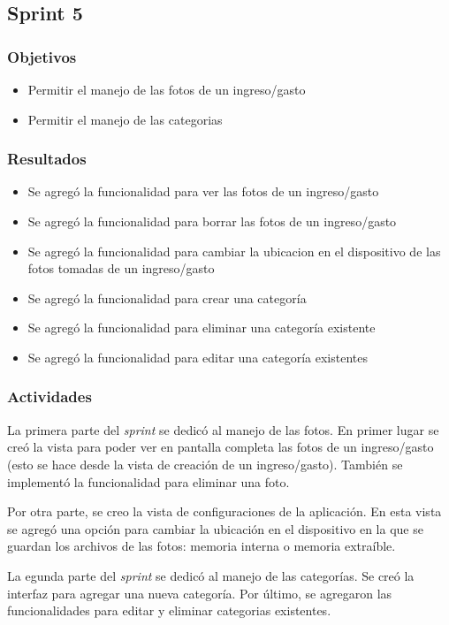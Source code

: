 \subsection{Sprint 5}
\subsubsection{Objetivos}
\begin{itemize}
\item Permitir el manejo de las fotos de un ingreso/gasto
\item Permitir el manejo de las categorias
\end{itemize}

\subsubsection{Resultados}
\begin{itemize}
\item Se agregó la funcionalidad para ver las fotos de un ingreso/gasto
\item Se agregó la funcionalidad para borrar las fotos de un ingreso/gasto
\item Se agregó la funcionalidad para cambiar la ubicacion en el dispositivo de las fotos tomadas de un ingreso/gasto
\item Se agregó la funcionalidad para crear una categoría
\item Se agregó la funcionalidad para eliminar una categoría existente
\item Se agregó la funcionalidad para editar una categoría existentes
\end{itemize}

\subsubsection{Actividades}
La primera parte del \textit{sprint} se dedicó al manejo de las fotos. En primer lugar se creó la vista para poder ver en pantalla completa las fotos de un ingreso/gasto (esto se hace desde la vista de creación de un ingreso/gasto). También se implementó la funcionalidad para eliminar una foto.

Por otra parte, se creo la vista de configuraciones de la aplicación. En esta vista se agregó una opción para cambiar la ubicación en el dispositivo en la que se guardan los archivos de las fotos: memoria interna o memoria extraíble.

La egunda parte del \textit{sprint} se dedicó al manejo de las categorías. Se creó la interfaz para agregar una nueva categoría. Por último, se agregaron las funcionalidades para editar y eliminar categorias existentes.


